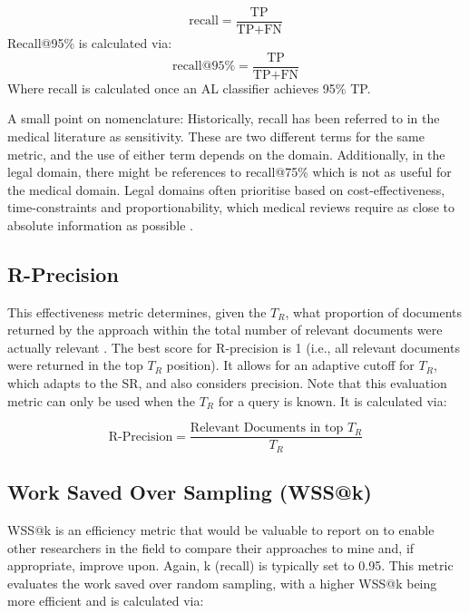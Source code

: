 \documentclass[10pt, english]{article}
\begin{document}
\begin{equation}
\text{recall} = \frac{\text{TP}}{\text{TP} + \text{FN}}
\end{equation}
Recall@95\% is calculated via:
\begin{equation}
\text{recall@95\%} = \frac{\text{TP}}{\text{TP} + \text{FN}}
\end{equation}
Where recall is calculated once an AL classifier achieves 95\% TP.

A small point on nomenclature: Historically, recall has been referred to in the medical literature as sensitivity. These are two different terms for the same metric, and the use of either term depends on the domain. Additionally, in the legal domain, there might be references to recall@75\% which is not as useful for the medical domain. Legal domains often prioritise based on cost-effectiveness, time-constraints and proportionability, which medical reviews require as close to absolute information as possible \cite{tsafnat_systematic_2014}.

\subsection{R-Precision}
This effectiveness metric determines, given the \textbf{$T_R$}, what proportion of documents returned by the approach within the total number of relevant documents were actually relevant \cite{manning_introduction_2008}. The best score for R-precision is 1 (i.e., all relevant documents were returned in the top \textbf{$T_R$} position). It allows for an adaptive cutoff for \textbf{$T_R$}, which adapts to the SR, and also considers precision. Note that this evaluation metric can only be used when the \textbf{$T_R$} for a query is known. It is calculated via:

\begin{equation}
\text{R-Precision} = \frac{\text{Relevant Documents in top } T_R}{T_R}
\end{equation}
\subsection{Work Saved Over Sampling (WSS@k)}

WSS@k is an efficiency metric that would be valuable to report on to enable other researchers in the field to compare their approaches to mine and, if appropriate, improve upon. Again, k (recall) is typically set to 0.95. This metric evaluates the work saved over random sampling, with a higher WSS@k being more efficient and is calculated via:
\end{document}
